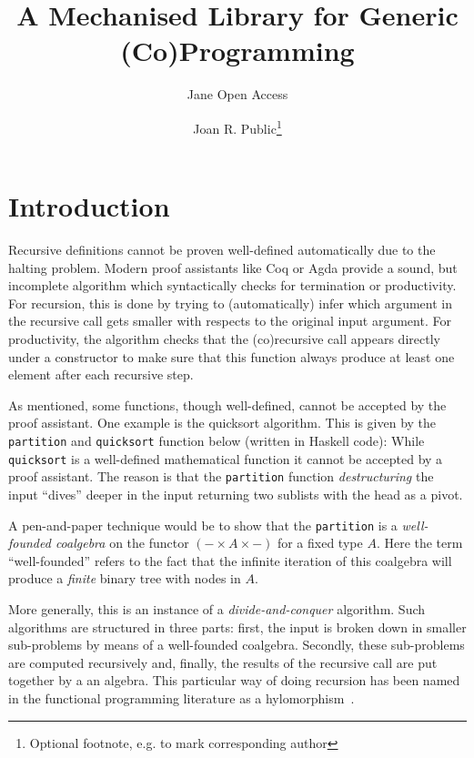 \documentclass[a4paper, UKenglish, cleveref, autoref, thm-restate]{lipics-v2021}
\title{A Mechanised Library for Generic (Co)Programming}
\author{Jane {Open Access}}{Dummy University Computing Laboratory, [optional: Address], Country \and My second affiliation, Country \and \url{http://www.myhomepage.edu} }{johnqpublic@dummyuni.org}{https://orcid.org/0000-0002-1825-0097}{(Optional) author-specific funding acknowledgements}%
\author{Joan R. Public\footnote{Optional footnote, e.g. to mark corresponding author}}{Department of Informatics, Dummy College, [optional: Address], Country}{joanrpublic@dummycollege.org}{[orcid]}{[funding]}
\newcommand{\haskell}[1]{\texttt{#1}}
\begin{document}
\maketitle

\begin{abstract}

\end{abstract}

\section{Introduction}
\label{sec:intro}
Recursive definitions cannot be proven well-defined automatically due to the
halting problem. Modern proof assistants like Coq or Agda provide a sound, but
incomplete algorithm which syntactically checks for termination or productivity.
For recursion, this is done by trying to (automatically) infer which argument in
the recursive call gets smaller with respects to the original input argument.
For productivity, the algorithm checks that the (co)recursive call appears
directly under a constructor to make sure that this function always produce at
least one element after each recursive step.

As mentioned, some functions, though well-defined, cannot be accepted by the
proof assistant. One example is the quicksort algorithm. This is given by the
\haskell{partition} and \haskell{quicksort} function below (written in Haskell
code):
While \haskell{quicksort} is a well-defined mathematical function it cannot be
accepted by a proof assistant.  The reason is that the \haskell{partition}
function \emph{destructuring} the input ``dives'' deeper in the input returning
two sublists with the head as a pivot.

A pen-and-paper technique would be to show that the \haskell{partition} is a
\emph{well-founded coalgebra} on the functor $(- \times A \times -)$ for a fixed
type $A$. Here the term ``well-founded'' refers to the fact that the infinite
iteration of this coalgebra will produce a \emph{finite} binary tree with nodes
in $A$.

More generally, this is an instance of a \emph{divide-and-conquer} algorithm.
Such algorithms are structured in three parts: first, the input is broken down
in smaller sub-problems by means of a well-founded coalgebra. Secondly, these
sub-problems are computed recursively and, finally, the results of the recursive
call are put together by a an algebra. This particular way of doing recursion
has been named in the functional programming literature as a
hylomorphism~\cite{MeijerFP91, HuIT96}.
\end{document}

